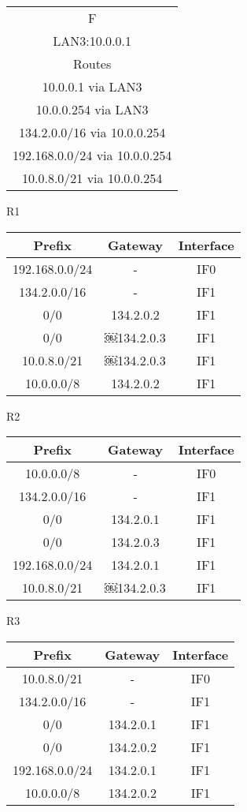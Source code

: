 \documentclass[paper=a4, fontsize=11pt]{scrartcl}
\numberwithin{equation}{section}
\numberwithin{figure}{section}
\numberwithin{table}{section}
\begin{document}
\begin{tabular}{|c|}
\hline
F\\
LAN3:10.0.0.1\\
Routes\\
10.0.0.1 via LAN3\\
10.0.0.254 via LAN3\\
134.2.0.0/16 via 10.0.0.254\\
192.168.0.0/24 via 10.0.0.254\\
10.0.8.0/21 via 10.0.0.254
\\\hline
\end{tabular}\newline\newline

R1\newline
\begin{tabular}{|c|c|c|}
\hline
Prefix & Gateway & Interface\\\hline
192.168.0.0/24 & - & IF0\\
134.2.0.0/16 & - & IF1\\
0/0 & 134.2.0.2 & IF1\\
0/0 & ￼134.2.0.3 & IF1\\
10.0.8.0/21 & ￼134.2.0.3 & IF1\\
10.0.0.0/8 & 134.2.0.2 & IF1
\\\hline
\end{tabular}\newline\newline

R2\newline
\begin{tabular}{|c|c|c|}
\hline
Prefix & Gateway & Interface\\\hline
10.0.0.0/8 & - & IF0\\
134.2.0.0/16 & - & IF1\\
0/0 & 134.2.0.1 & IF1\\
0/0 & 134.2.0.3 & IF1\\
192.168.0.0/24 & 134.2.0.1 & IF1\\
10.0.8.0/21 & ￼134.2.0.3 & IF1
\\\hline
\end{tabular}\newline\newline

R3\newline
\begin{tabular}{|c|c|c|}
\hline
Prefix & Gateway & Interface\\\hline
10.0.8.0/21 & - & IF0\\
134.2.0.0/16 & - & IF1\\
0/0 & 134.2.0.1 & IF1\\
0/0 & 134.2.0.2 & IF1\\
192.168.0.0/24 & 134.2.0.1 & IF1\\
10.0.0.0/8 & 134.2.0.2 & IF1
\\\hline
\end{tabular}\newline\newline
\end{document}
